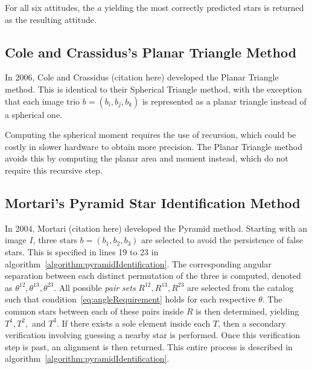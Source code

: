 For all six attitudes, the $a$ yielding the most correctly predicted stars is returned as the resulting attitude.

\subsection{Cole and Crassidus's Planar Triangle Method}\label{subsec:coleAndCrassidus'sPlanarTriangleMethod}
In 2006, Cole and Crassidus (citation here) developed the Planar Triangle method. This is identical to their Spherical
Triangle method, with the exception that each image trio $b = (b_i, b_j, b_k)$ is represented as a planar triangle
instead of a spherical one.

Computing the spherical moment requires the use of recursion, which could be costly in slower hardware to obtain more
precision. The Planar Triangle method avoids this by computing the planar area and moment instead, which do not require
this recursive step.

\subsection{Mortari's Pyramid Star Identification Method}\label{subsec:mortari'sPyramidStarIdentificationMethod}
In 2004, Mortari (citation here) developed the Pyramid method. Starting with an image $I$, three stars
$b = (b_1, b_2, b_3)$ are selected to avoid the persistence of false stars. This is specified in lines 19 to 23 in
algorithm~\autoref{algorithm:pyramidIdentification}. The corresponding angular separation between each distinct
permutation of the three is computed, denoted as $\theta^{12}, \theta^{13}, \theta^{23}$. All possible
\textit{pair sets} $R^{12}, R^{13}, R^{23}$ are selected from the catalog such that
condition~\eqref{eq:angleRequirement} holds for each respective $\theta$. The common stars between each of these
pairs inside $R$ is then determined, yielding $T^1, T^2, $ and $T^3$. If there exists a sole element inside each
$T$, then a secondary verification involving guessing a nearby star is performed. Once this verification step is
past, an alignment is then returned. This entire process is described in
algorithm~\autoref{algorithm:pyramidIdentification}.

